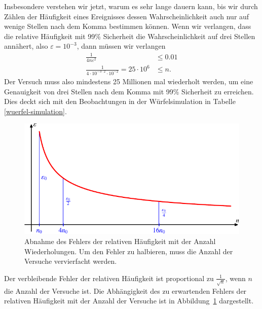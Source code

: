 Insbesondere verstehen wir jetzt, warum es sehr lange dauern kann, bis
wir durch Zählen der Häufigkeit eines Ereignisses dessen Wahrscheinlichkeit
auch nur auf wenige Stellen nach dem Komma bestimmen können.
Wenn wir verlangen, dass die relative Häufigkeit mit
99\% Sicherheit die Wahrscheinlichkeit auf drei Stellen annähert, also
$\varepsilon=10^{-3}$, dann müssen wir verlangen
\begin{align*}
\frac{1}{4n\varepsilon^2}&\le 0.01\\
\frac1{4\cdot 10^{-3\cdot 2}\cdot10^{-2}}=25\cdot 10^6&\le n.
\end{align*}
Der Versuch muss also mindestens 25 Millionen mal wiederholt werden,
um eine Genauigkeit von drei Stellen nach dem Komma mit 99\% Sicherheit
zu erreichen.
Dies deckt sich mit den Beobachtungen in der Würfelsimulation
in Tabelle
\ref{wuerfel-simulation}.
\begin{figure}
\centering
\includegraphics{images/erwartung-7.pdf}
\caption{Abnahme des Fehlers der relativen Häufigkeit mit der Anzahl
Wiederholungen.
Um den Fehler zu halbieren, muss die Anzahl der Versuche
vervierfacht werden.
\label{fehlerabnahme}}
\end{figure}
Der verbleibende Fehler der relativen Häufigkeit ist proportional zu
$\frac1{\sqrt{n}}$, wenn $n$ die Anzahl der Versuche ist.
Die Abhängigkeit des zu erwartenden Fehlers der relativen Häufigkeit mit
der Anzahl der Versuche ist in Abbildung~\ref{fehlerabnahme} dargestellt.


